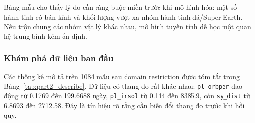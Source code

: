 \begin{table}[H]
\centering
\caption{Một vài dòng dữ liệu mẫu sau schema filter và trước domain restriction}
\label{tab:part2_sample_data}
\end{table}

Bảng mẫu cho thấy lý do cần ràng buộc miền trước khi mô hình hóa: một số hành tinh có bán kính và
khối lượng vượt xa nhóm hành tinh đá/Super-Earth. Nếu trộn chung các nhóm vật lý khác nhau, mô
hình tuyến tính dễ học một quan hệ trung bình kém ổn định.

\subsubsection{Khám phá dữ liệu ban đầu}

Các thống kê mô tả trên 1084 mẫu sau domain restriction được tóm tắt trong
Bảng~\ref{tab:part2_describe}. Dữ liệu có thang đo rất khác nhau: \texttt{pl\_orbper} dao động từ
0.1769 đến 199.6688 ngày, \texttt{pl\_insol} từ 0.144 đến 8385.9, còn \texttt{sy\_dist} từ
6.8693 đến 2712.58. Đây là tín hiệu rõ rằng cần biến đổi thang đo trước khi hồi quy.

